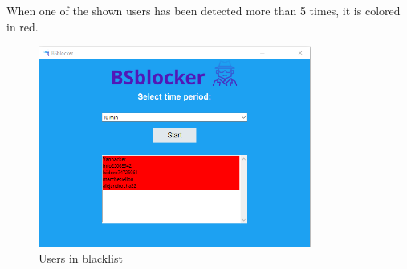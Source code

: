 \noindent
When one of the shown users has been detected more than 5 times, it is colored in red.


\begin{figure}[H]
    \centering
    \includegraphics[width= 0.8\textwidth]{images/application/blacklist.PNG}
    \caption{Users in blacklist} 
    \label{application-blacklist}
\end{figure}





